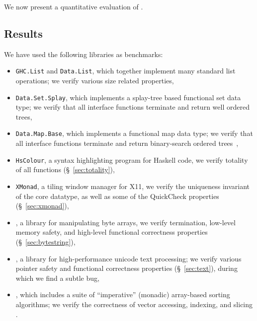 We now present a quantitative evaluation of \toolname.



\subsection{Results}

We have used the following libraries as benchmarks:
%
\begin{itemize}
\item \texttt{GHC.List} and \texttt{Data.List}, which together implement many standard
      list operations; we verify various
      size related properties,
\item \texttt{Data.Set.Splay}, which implements a splay-tree
      based functional set data type; we verify that all interface 
      functions terminate and return well ordered trees,
\item \texttt{Data.Map.Base}, which implements a functional 
      map data type; we verify that all interface functions 
      terminate and return binary-search ordered trees~\cite{vazou13}, 
\item \texttt{HsColour}, a syntax highlighting program for Haskell code, we
      verify totality of all functions (\S~\ref{sec:totality}),
\item \texttt{XMonad}, a tiling window manager for X11, we verify the uniqueness
      invariant of the core datatype, as well as some of the QuickCheck
      properties (\S~\ref{sec:xmonad}),
\item \bytestring, a library for manipulating byte arrays, we
      verify termination, low-level memory safety, and high-level
      functional correctness properties (\S~\ref{sec:bytestring}),
\item \libtext, a library for high-performance unicode text 
      processing; we verify various pointer safety and 
      functional correctness properties (\S~\ref{sec:text}),
      during which we find a subtle bug,
\item \libvectoralgos, which includes a suite of 
      ``imperative'' (\ie monadic) array-based sorting algorithms; 
      we verify the correctness of vector accessing, indexing, and slicing \etc.
\end{itemize}


